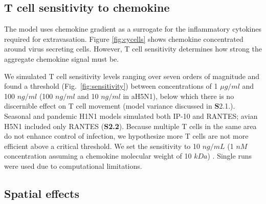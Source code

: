 \documentclass[10pt]{article}
\begin{document}
\subsection*{T cell sensitivity to chemokine}

The model uses chemokine gradient as a surrogate for the inflammatory cytokines required for extravasation.  Figure \ref{fig:cycells} shows chemokine concentrated around virus secreting cells.  However, T cell sensitivity determines how strong the aggregate chemokine signal must be.

We simulated T cell sensitivity levels ranging over seven orders of magnitude and found a threshold (Fig.~\ref{fig:sensitivity}) between concentrations of 1 $\mu g/ml$ and 100 $ng/ml$ (100 $ng/ml$ and 10 $ng/ml$ in aH5N1), below which there is no discernible effect on T cell movement (model variance discussed in \textbf{S}2.1.).  Seasonal and pandemic H1N1 models simulated both IP-10 and RANTES; avian H5N1 included only RANTES (\textbf{S2.2}).  Because multiple T cells in the same area do not enhance control of infection, we hypothesize more T cells are not more efficient above a critical threshold.  We set the sensitivity to 10 $ng/mL$ (1 $nM$ concentration assuming a chemokine molecular weight of 10 $kDa$) \cite{Gao2003}.  Single runs were used due to computational limitations.  


\subsection*{Spatial effects}
\end{document}
